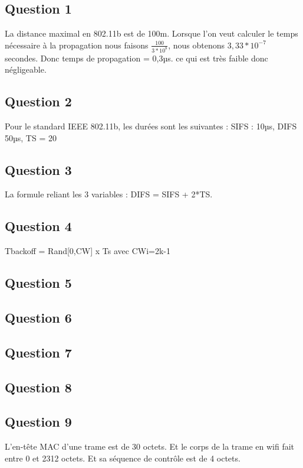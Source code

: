 \documentclass[12pt, a4paper]{article}
\begin{document}
\subsection{Question 1}
La distance maximal en 802.11b est de 100m. Lorsque l'on veut calculer le temps
nécessaire à la propagation nous faisons $ \frac{100}{3*10^{8}} $, nous obtenons
$ 3,33*10^{-7} $ secondes. Donc temps de propagation = 0,3µs. ce qui est très faible donc
négligeable.

\subsection{Question 2}
Pour le standard IEEE 802.11b, les durées sont les suivantes : SIFS : 10µs, 
DIFS 50µs, TS = 20

\subsection{Question 3}
La formule reliant les 3 variables : DIFS = SIFS + 2*TS.

\subsection{Question 4}
Tbackoff = Rand[0,CW] x Ts avec CWi=2k-1

\subsection{Question 5}

\subsection{Question 6}

\subsection{Question 7}

\subsection{Question 8}

\subsection{Question 9}
L'en-tête MAC d'une trame est de 30 octets. 
Et le corps de la trame en wifi fait entre 0 et 2312 octets.
Et sa séquence de contrôle est de 4 octets.
\end{document}
